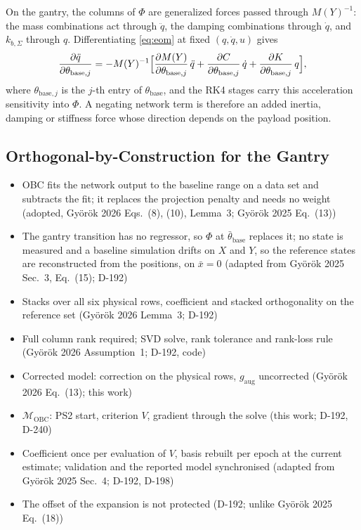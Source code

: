 On the gantry, the columns of $\Phi$ are generalized forces passed through
$M(Y)^{-1}$: the mass combinations act through $\ddot q$, the damping
combinations through $\dot q$, and $k_{b,\Sigma}$ through $q$.
Differentiating \eqref{eq:eom} at fixed $(q,\dot q,u)$ gives
\begin{equation}
 \frac{\partial\ddot q}{\partial\theta_{\mathrm{base},j}}
 =-M(Y)^{-1}\Bigl[\frac{\partial M(Y)}{\partial\theta_{\mathrm{base},j}}\,\ddot q
 +\frac{\partial C}{\partial\theta_{\mathrm{base},j}}\,\dot q
 +\frac{\partial K}{\partial\theta_{\mathrm{base},j}}\,q\Bigr],
\label{eq:obc_gantry_sens}
\end{equation}
where $\theta_{\mathrm{base},j}$ is the $j$-th entry of
$\theta_{\mathrm{base}}$, and the RK4 stages carry this acceleration
sensitivity into $\Phi$.
A negating network term is therefore an added inertia, damping or stiffness
force whose direction depends on the payload position.

\subsection{Orthogonal-by-Construction for the Gantry}\label{sec:obc_map}
\ifdraft
\begin{itemize}
\item OBC fits the network output to the baseline range on a data set and subtracts the fit; it replaces the projection penalty and needs no weight (adopted, Gy\"or\"ok 2026 Eqs.~(8), (10), Lemma~3; Gy\"or\"ok 2025 Eq.~(13))
\item The gantry transition has no regressor, so $\Phi$ at $\bar\theta_{\mathrm{base}}$ replaces it; no state is measured and a baseline simulation drifts on $X$ and $Y$, so the reference states are reconstructed from the positions, on $\bar x=0$ (adapted from Gy\"or\"ok 2025 Sec.~3, Eq.~(15); D-192)
\item Stacks over all six physical rows, coefficient and stacked orthogonality on the reference set (Gy\"or\"ok 2026 Lemma~3; D-192)
\item Full column rank required; SVD solve, rank tolerance and rank-loss rule (Gy\"or\"ok 2026 Assumption~1; D-192, code)
\item Corrected model: correction on the physical rows, $g_{\mathrm{aug}}$ uncorrected (Gy\"or\"ok 2026 Eq.~(13); this work)
\item $\mathcal M_{\mathrm{OBC}}$: PS2 start, criterion $V$, gradient through the solve (this work; D-192, D-240)
\item Coefficient once per evaluation of $V$, basis rebuilt per epoch at the current estimate; validation and the reported model synchronised (adapted from Gy\"or\"ok 2025 Sec.~4; D-192, D-198)
\item The offset of the expansion is not protected (D-192; unlike Gy\"or\"ok 2025 Eq.~(18))
\end{itemize}
\fi

